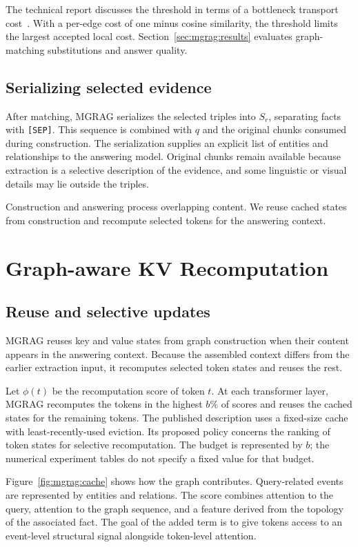 The technical report discusses the threshold in terms of a bottleneck transport cost~\cite{mgrag-tech-report}. With a per-edge cost of one minus cosine similarity, the threshold limits the largest accepted local cost. Section~\ref{sec:mgrag:results} evaluates graph-matching substitutions and answer quality.

\subsection{Serializing selected evidence}

After matching, MGRAG serializes the selected triples into $S_r$, separating facts with \texttt{[SEP]}. This sequence is combined with $q$ and the original chunks consumed during construction. The serialization supplies an explicit list of entities and relationships to the answering model. Original chunks remain available because extraction is a selective description of the evidence, and some linguistic or visual details may lie outside the triples.

Construction and answering process overlapping content. We reuse cached states from construction and recompute selected tokens for the answering context.

\section{Graph-aware KV Recomputation}
\label{sec:mgrag:cache}

\subsection{Reuse and selective updates}

MGRAG reuses key and value states from graph construction when their content appears in the answering context. Because the assembled context differs from the earlier extraction input, it recomputes selected token states and reuses the rest.

Let $\phi(t)$ be the recomputation score of token $t$. At each transformer layer, MGRAG recomputes the tokens in the highest $b\%$ of scores and reuses the cached states for the remaining tokens. The published description uses a fixed-size cache with least-recently-used eviction. Its proposed policy concerns the ranking of token states for selective recomputation. The budget is represented by $b$; the numerical experiment tables do not specify a fixed value for that budget.

Figure~\ref{fig:mgrag:cache} shows how the graph contributes. Query-related events are represented by entities and relations. The score combines attention to the query, attention to the graph sequence, and a feature derived from the topology of the associated fact. The goal of the added term is to give tokens access to an event-level structural signal alongside token-level attention.

